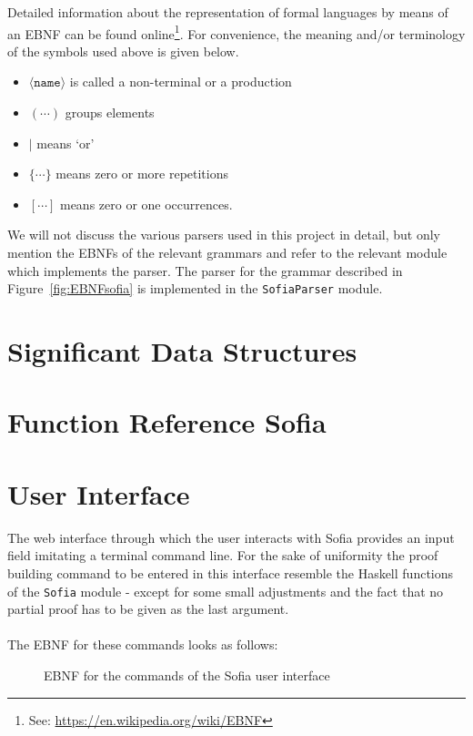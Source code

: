 \documentclass[notitlepage]{report}
\newcommand\m[1]{\texttt{#1}}
\begin{document}
Detailed information about the representation of formal languages by means of an
EBNF can be found online\footnote{%
See: \url{https://en.wikipedia.org/wiki/EBNF}}. For convenience,
the meaning and/or terminology of the symbols used above is given below.
\begin{multicols}{2}
\begin{itemize}
    \item $\langle\texttt{name}\rangle$ is called a non-terminal or a production
    \item $(\cdots)$ groups elements
    \item $|$ means `or'
    \item $\{\cdots\}$ means zero or more repetitions
    \item $[\cdots]$ means zero or one occurrences.
\end{itemize}
\end{multicols}

We will not discuss the various parsers used in this project in detail, but only
mention the EBNFs of the relevant grammars and refer to the relevant module
which implements the parser. The parser for the grammar described in
Figure~\ref{fig:EBNFsofia} is implemented in the \m{SofiaParser} module.

\chapter{Significant Data Structures}


\chapter{Function Reference Sofia}


\chapter{User Interface}
The web interface through which the user interacts with Sofia provides an input
field imitating a terminal command line. For the sake of uniformity the proof
building command to be entered in this interface resemble the Haskell functions
of the \m{Sofia} module - except for some small adjustments and the fact that no
partial proof has to be given as the last argument.
\\\\
The EBNF for these commands looks as follows:
\begin{figure}[h!]
    {\renewcommand{\arraystretch}{2.0}
    }
    \caption{EBNF for the commands of the Sofia
             user interface}\label{fig:EBNFcmds}
\end{figure}
\end{document}
